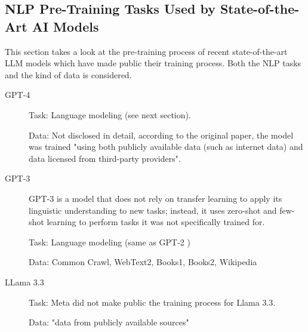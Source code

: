 \subsection{NLP Pre-Training Tasks Used by State-of-the-Art AI Models}
This section takes a look at the pre-training process of recent state-of-the-art LLM models which have made public their training process.
Both the NLP tasks and the kind of data is considered.


\begin{description}
	\item[GPT-4] \cite{openaiGPT4TechnicalReport2024}

	      Task: Language modeling (see next section).

	      Data: Not disclosed in detail, according to the original paper, the model was trained "using both publicly available data (such as internet data) and data licensed from third-party providers".
	\item[GPT-3] \cite{brownLanguageModelsAre2020}
	      GPT-3 is a model that does not rely on transfer learning to apply its linguistic understanding to new tasks; instead, it uses zero-shot and few-shot learning to perform tasks it was not specifically trained for.

	      Task: Language modeling (same as GPT-2 \cite{radfordLanguageModelsAre2019})

	      Data: Common Crawl, WebText2, Books1, Books2, Wikipedia 
	\item[LLama 3.3] \cite{LlamamodelsModelsLlama3_3}


	      Task: Meta did not make public the training process for Llama 3.3.

	      Data: "data from publicly available sources"
\end{description}


